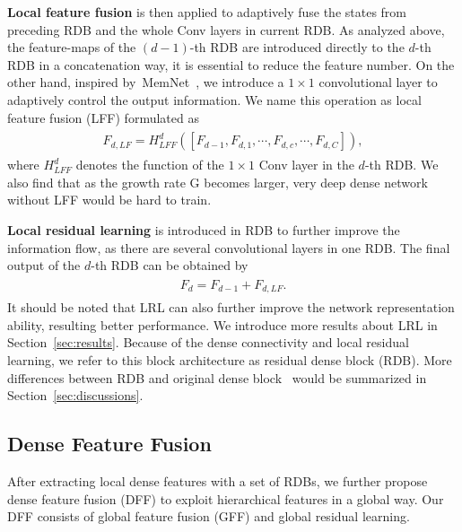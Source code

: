\documentclass[10pt,twocolumn,letterpaper]{article}
\begin{document}
\textbf{Local feature fusion} is then applied to adaptively fuse the states from preceding RDB and the whole Conv layers in current RDB. As analyzed above, the feature-maps of the $\left ( d-1 \right )$-th RDB are introduced directly to the $d$-th RDB in a concatenation way, it is essential to reduce the feature number. On the other hand, inspired by~MemNet~\cite{tai2017memnet}, we introduce a $1\times 1$ convolutional layer to adaptively control the output information. We name this operation as local feature fusion (LFF) formulated as
\begin{align}
\begin{split}
\label{eq:F_d_LF}
F_{d,LF}=H_{LFF}^{d}\left ( \left [ F_{d-1},F_{d,1},\cdots ,F_{d,c},\cdots ,F_{d,C}\right ] \right ),
\end{split}
\end{align}
where $H_{LFF}^{d}$ denotes the function of the $1\times 1$ Conv layer in the $d$-th RDB. We also find that as the growth rate G becomes larger, very deep dense network without LFF would be hard to train.

\textbf{Local residual learning} is introduced in RDB to further improve the information flow, as there are several convolutional layers in one RDB. The final output of the $d$-th RDB can be obtained by
\begin{align}
\begin{split}
\label{eq:F_d_RDB}
F_{d}=F_{d-1}+F_{d,LF}.
\end{split}
\end{align}
It should be noted that LRL can also further improve the network representation ability, resulting better performance. We introduce more results about LRL in Section~\ref{sec:results}. Because of the dense connectivity and local residual learning, we refer to this block architecture as residual dense block (RDB). More differences between RDB and original dense block~\cite{huang2017densely} would be summarized in Section~\ref{sec:discussions}.

\subsection{Dense Feature Fusion}
\label{subsec:DFF}
After extracting local dense features with a set of RDBs, we further propose dense feature fusion (DFF) to exploit hierarchical features in a global way. Our DFF consists of global feature fusion (GFF) and global residual learning. 
\end{document}
